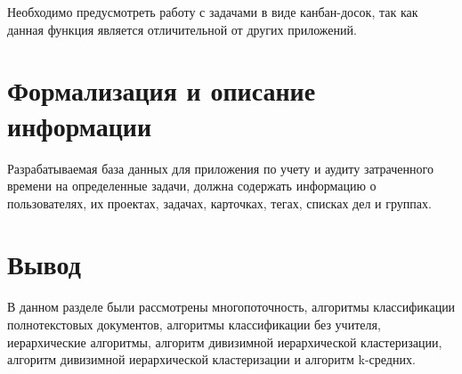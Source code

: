 Необходимо предусмотреть работу с задачами в виде канбан-досок, так как данная функция является отличительной от других приложений.

\section{Формализация и описание информации}
 
Разрабатываемая база данных для приложения по учету и аудиту затраченного времени на определенные задачи, должна содержать информацию о пользователях, их проектах, задачах, карточках, тегах, списках дел и группах.



\section *{Вывод}
В данном разделе были рассмотрены многопоточность, алгоритмы классификации полнотекстовых документов, алгоритмы классификации без учителя, иерархические алгоритмы, алгоритм дивизимной иерархической кластеризации, алгоритм дивизимной иерархической кластеризации и алгоритм k-средних.
